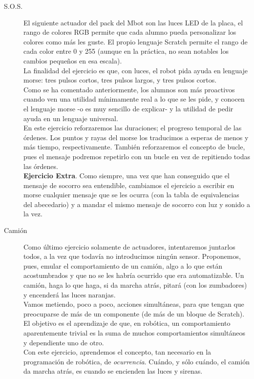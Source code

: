 \begin{description}
\item [S.O.S.]\label{ej:sos}
El siguiente actuador del pack del Mbot son las luces LED de la placa, el rango de colores RGB permite que cada alumno pueda personalizar los colores como más les guste. El propio lenguaje Scratch permite el rango de cada color entre 0 y 255 (aunque en la práctica, no sean notables los cambios pequeños en esa escala).\\
La finalidad del ejercicio es que, con luces, el robot pida ayuda en lenguaje morse: tres pulsos cortos, tres pulsos largos, y tres pulsos cortos. \\
Como se ha comentado anteriormente, los alumnos son más proactivos cuando ven una utilidad mínimamente real a lo que se les pide, y conocen el lenguaje morse -o es muy sencillo de explicar- y la utilidad de pedir ayuda en un lenguaje universal.\\
En este ejercicio reforzaremos las duraciones; el progreso temporal de las órdenes. Los puntos y rayas del morse los traducimos a esperas de menos y más tiempo, respectivamente. También reforzaremos el concepto de bucle, pues el mensaje podremos repetirlo con un bucle en vez de repitiendo todas las órdenes. \\
\textbf{Ejercicio Extra}. Como siempre, una vez que han conseguido que el mensaje de socorro sea entendible, cambiamos el ejercicio a escribir en morse cualquier mensaje que se les ocurra (con la tabla de equivalencias del abecedario) y a mandar el mismo mensaje de socorro con luz y sonido a la vez.
\item[Camión]\label{ej:camion}
Como último ejercicio solamente de actuadores, intentaremos juntarlos todos, a la vez que todavía no introducimos ningún sensor. Proponemos, pues, emular el comportamiento de un camión, algo a lo que están acostumbrados y que no se les habría ocurrido que era automatizable. Un camión, haga lo que haga, si da marcha atrás, pitará (con los zumbadores) y encenderá las luces naranjas. \\
Vamos metiendo, poco a poco, acciones simultáneas, para que tengan que preocuparse de más de un componente (de más de un bloque de Scratch). El objetivo es el aprendizaje de que, en robótica, un comportamiento aparentemente trivial es la suma de muchos comportamientos simultáneos y dependiente uno de otro.\\
Con este ejercicio, aprendemos el concepto, tan necesario en la programación de robótica, de \textit{ocurrencia}. Cuándo, y sólo cuándo, el camión da marcha atrás, es cuando se encienden las luces y sirenas.
\end{description}

